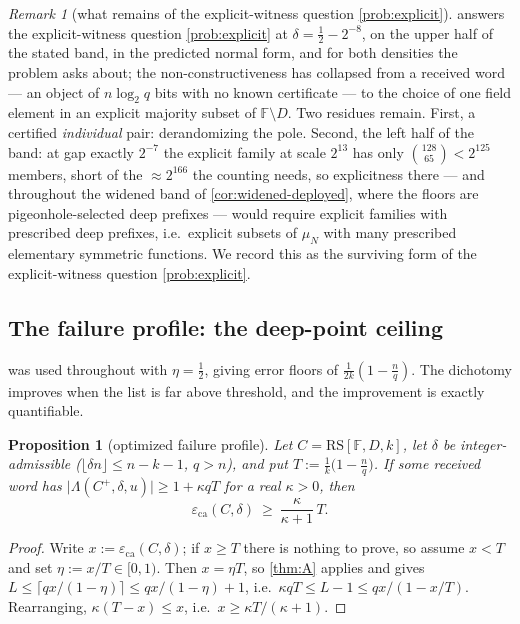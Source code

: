 \documentclass[11pt]{article}
\newtheorem{proposition}[proposition]{Proposition}
\theoremstyle{definition}
\theoremstyle{remark}
\newtheorem{remark}[remark]{Remark}
\newcommand{\F}{\mathbb{F}}
\newcommand{\RS}{\mathrm{RS}}
\newcommand{\eca}{\varepsilon_{\mathrm{ca}}}
\newcommand{\Lst}{\Lambda}
\begin{document}
\begin{remark}[what remains of the explicit-witness question \cref{prob:explicit}]\label{rem:explicit-scope}
 answers the explicit-witness question \cref{prob:explicit} at $\delta=\frac12-2^{-8}$, on the upper half of the stated band, in the predicted normal form, and for both densities the problem asks about; the non-constructiveness has collapsed from a received word --- an object of $n\log_2q$ bits with no known certificate --- to the choice of one field element in an explicit majority subset of $\F\setminus D$. Two residues remain. First, a certified \emph{individual} pair: derandomizing the pole. Second, the left half of the band: at gap exactly $2^{-7}$ the explicit family at scale $2^{13}$ has only $\binom{128}{65}<2^{125}$ members, short of the $\approx2^{166}$ the counting needs, so explicitness there --- and throughout the widened band of \cref{cor:widened-deployed}, where the floors are pigeonhole-selected deep prefixes --- would require explicit families with prescribed deep prefixes, i.e.\ explicit subsets of $\mu_N$ with many prescribed elementary symmetric functions. We record this as the surviving form of the explicit-witness question \cref{prob:explicit}.
\end{remark}

\subsection{The failure profile: the deep-point ceiling}\label{sec:answers-profile}

 was used throughout with $\eta=\frac12$, giving error floors of $\frac1{2k}(1-\frac nq)$. The dichotomy improves when the list is far above threshold, and the improvement is exactly quantifiable.

\begin{proposition}[optimized failure profile]\label{prop:profile}
Let $C=\RS[\F,D,k]$, let $\delta$ be integer-admissible \textup($\lfloor\delta n\rfloor\le n-k-1$, $q>n$\textup), and put $T:=\frac1k\bigl(1-\frac nq\bigr)$. If some received word has $\bigl|\Lst(C^+,\delta,u)\bigr|\ge1+\kappa qT$ for a real $\kappa>0$, then
\[
\eca(C,\delta)\ \ge\ \frac{\kappa}{\kappa+1}\,T .
\]
\end{proposition}

\begin{proof}
Write $x:=\eca(C,\delta)$; if $x\ge T$ there is nothing to prove, so assume $x<T$ and set $\eta:=x/T\in[0,1)$. Then $x=\eta T$, so \cref{thm:A} applies and gives $L\le\lceil qx/(1-\eta)\rceil\le qx/(1-\eta)+1$, i.e.\ $\kappa qT\le L-1\le qx/(1-x/T)$. Rearranging, $\kappa(T-x)\le x$, i.e.\ $x\ge\kappa T/(\kappa+1)$.
\end{proof}
\end{document}
